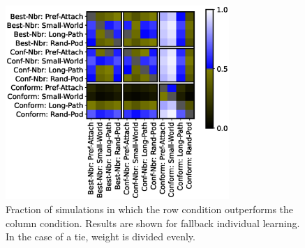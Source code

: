 \documentclass[twocolumn,10pt]{article}
\begin{document}
\begin{figure}
    \label{fig:results-frac-fallback}
    \centering
    \includegraphics[width=3.33in]{fig-result-frac-parallel.eps}
\caption{Fraction of simulations in which the row condition outperforms the column condition. Results are shown for fallback individual learning. In the case of a tie, weight is divided evenly.}
\end{figure}
\end{document}
